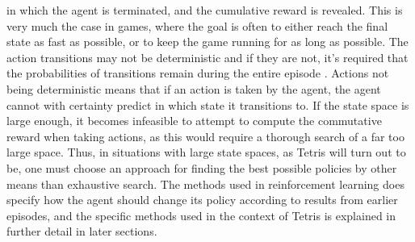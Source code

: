 in which the agent is terminated, and the cumulative reward 
is revealed. This is very much the case in games, where the goal 
is often to either reach the final state as fast as possible,
or to keep the game running for as long as possible.
The action transitions may 
not be deterministic and if they are not,
it's required that the probabilities of transitions
remain during the entire episode \citep{Carr}. Actions not being deterministic
means that if an action is taken by the agent, the agent cannot 
with certainty predict in which state it transitions to.
If the state space 
is large enough, it becomes infeasible to attempt to compute 
the commutative reward when taking actions, as this would require
a thorough search of a far too large space. Thus, in situations 
with large state spaces, as Tetris will turn out to be, one must choose 
an approach for finding the best possible policies by other
means than exhaustive search. The methods used in reinforcement learning 
does specify how the agent should change its policy according to 
results from earlier episodes, and the specific methods used in
the context of Tetris is explained in further detail in later sections.













